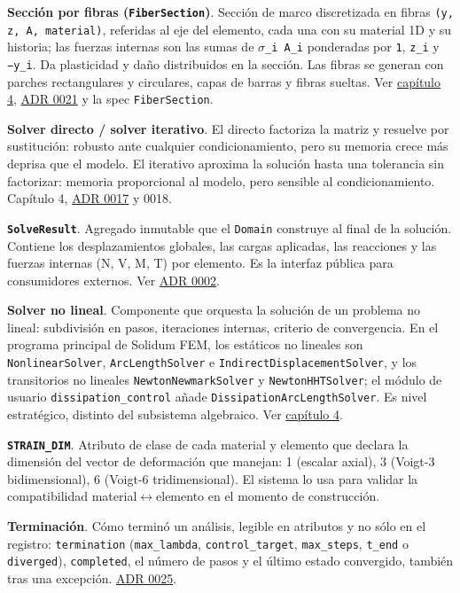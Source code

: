 \documentclass[11pt,oneside]{report}
\begin{document}
\textbf{Sección por fibras (\texttt{FiberSection})}. Sección de marco discretizada en fibras \texttt{(y, z, A, material)}, referidas al eje del elemento, cada una con su material 1D y su historia; las fuerzas internas son las sumas de \texttt{\ensuremath{\sigma}\_i A\_i} ponderadas por \texttt{1}, \texttt{z\_i} y \texttt{−y\_i}. Da plasticidad y daño distribuidos en la sección. Las fibras se generan con parches rectangulares y circulares, capas de barras y fibras sueltas. Ver \hyperref[cap:4]{capítulo 4}, \hyperref[adr:0021]{ADR 0021} y la spec \texttt{FiberSection}.

\textbf{Solver directo / solver iterativo}. El directo factoriza la matriz y resuelve por sustitución: robusto ante cualquier condicionamiento, pero su memoria crece más deprisa que el modelo. El iterativo aproxima la solución hasta una tolerancia sin factorizar: memoria proporcional al modelo, pero sensible al condicionamiento. Capítulo 4, \hyperref[adr:0017]{ADR 0017} y 0018.

\textbf{\texttt{SolveResult}}. Agregado inmutable que el \texttt{Domain} construye al final de la solución. Contiene los desplazamientos globales, las cargas aplicadas, las reacciones y las fuerzas internas (N, V, M, T) por elemento. Es la interfaz pública para consumidores externos. Ver \hyperref[adr:0002]{ADR 0002}.

\textbf{Solver no lineal}. Componente que orquesta la solución de un problema no lineal: subdivisión en pasos, iteraciones internas, criterio de convergencia. En el programa principal de Solidum FEM, los estáticos no lineales son \texttt{NonlinearSolver}, \texttt{ArcLengthSolver} e \texttt{IndirectDisplacementSolver}, y los transitorios no lineales \texttt{NewtonNewmarkSolver} y \texttt{NewtonHHTSolver}; el módulo de usuario \texttt{dissipation\_\allowbreak{}control} añade \texttt{DissipationArcLengthSolver}. Es nivel estratégico, distinto del subsistema algebraico. Ver \hyperref[cap:4]{capítulo 4}.

\textbf{\texttt{STRAIN\_DIM}}. Atributo de clase de cada material y elemento que declara la dimensión del vector de deformación que manejan: 1 (escalar axial), 3 (Voigt-3 bidimensional), 6 (Voigt-6 tridimensional). El sistema lo usa para validar la compatibilidad material\ensuremath{\leftrightarrow}elemento en el momento de construcción.

\textbf{Terminación}. Cómo terminó un análisis, legible en atributos y no sólo en el registro: \texttt{termination} (\texttt{max\_lambda}, \texttt{control\_target}, \texttt{max\_steps}, \texttt{t\_end} o \texttt{diverged}), \texttt{completed}, el número de pasos y el último estado convergido, también tras una excepción. \hyperref[adr:0025]{ADR 0025}.
\end{document}
